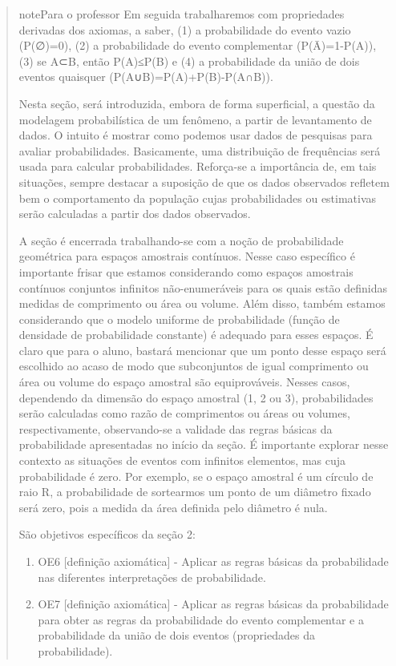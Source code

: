 \begin{quote}
\begin{sphinxadmonition}{note}{Para o professor}
Em seguida trabalharemos com propriedades derivadas dos axiomas, a saber, (1) a probabilidade do evento vazio (P(∅)=0), (2) a probabilidade do evento complementar (P(Ā)=1-P(A)), (3) se A⊂B, então P(A)≤P(B) e (4) a probabilidade da união de dois eventos quaisquer (P(A∪B)=P(A)+P(B)-P(A∩B)).

Nesta seção, será introduzida, embora de forma superficial, a questão da modelagem probabilística de um fenômeno, a partir de levantamento de dados. O intuito é mostrar como podemos usar dados de pesquisas para avaliar probabilidades. Basicamente, uma distribuição de frequências será usada para calcular probabilidades. Reforça-se a importância de, em tais situações, sempre destacar a suposição de que os dados observados refletem bem o comportamento da população cujas probabilidades ou estimativas serão calculadas a partir dos dados observados.

A seção é encerrada trabalhando-se com a noção de probabilidade geométrica para espaços amostrais contínuos. Nesse caso específico é importante frisar que estamos considerando como espaços amostrais contínuos conjuntos infinitos não-enumeráveis para os quais estão definidas medidas de comprimento ou área ou volume. Além disso, também estamos considerando que o modelo uniforme de probabilidade (função de densidade de probabilidade constante) é adequado para esses espaços. É claro que para o aluno, bastará mencionar que um ponto desse espaço será escolhido ao acaso de modo que subconjuntos de igual comprimento ou área ou volume do espaço amostral são equiprováveis. Nesses casos, dependendo da dimensão do espaço amostral (1, 2 ou 3), probabilidades serão calculadas como razão de comprimentos ou áreas ou volumes, respectivamente, observando-se a validade das regras básicas da probabilidade apresentadas no início da seção. É importante explorar nesse contexto as situações de eventos com infinitos elementos, mas cuja probabilidade é zero. Por exemplo, se o espaço amostral é um círculo de raio R, a probabilidade de sortearmos um ponto de um diâmetro fixado será zero, pois a medida da área definida pelo diâmetro é nula.

São objetivos específicos da seção 2:
\begin{enumerate}
\item {} 
OE6 {[}definição axiomática{]} - Aplicar as regras básicas da probabilidade nas diferentes interpretações de probabilidade.

\item {} 
OE7 {[}definição axiomática{]} - Aplicar as regras básicas da probabilidade para obter as regras da probabilidade do evento complementar e a probabilidade da união de dois eventos (propriedades da probabilidade).


\end{enumerate}
\end{sphinxadmonition}
\end{quote}
